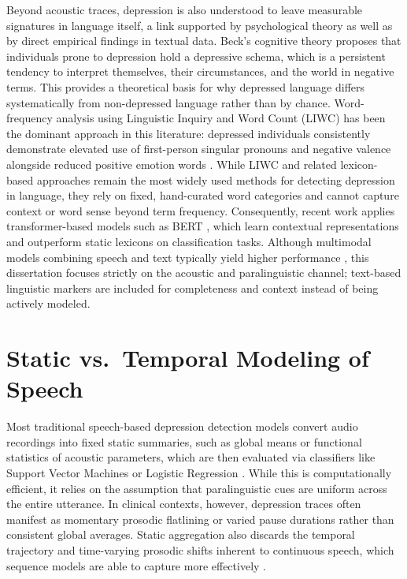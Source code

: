 \documentclass{mproj}
\begin{document}
Beyond acoustic traces, depression is also understood to leave measurable signatures in language itself, a link supported by psychological theory as well as by direct empirical findings in textual data. Beck's \cite{beck1967} cognitive theory proposes that individuals prone to depression hold a depressive schema, which is a persistent tendency to interpret themselves, their circumstances, and the world in negative terms. This provides a theoretical basis for why depressed language differs systematically from non-depressed language rather than by chance. Word-frequency analysis using Linguistic Inquiry and Word Count (LIWC) \cite{tausczik2010} has been the dominant approach in this literature: depressed individuals consistently demonstrate elevated use of first-person singular pronouns and negative valence alongside reduced positive emotion words \cite{rude2004}. While LIWC and related lexicon-based approaches remain the most widely used methods for detecting depression in language, they rely on fixed, hand-curated word categories and cannot capture context or word sense beyond term frequency. Consequently, recent work applies transformer-based models such as BERT \cite{senn2022}, which learn contextual representations and outperform static lexicons on classification tasks. Although multimodal models combining speech and text typically yield higher performance \cite{alhanai2018}, this dissertation focuses strictly on the acoustic and paralinguistic channel; text-based linguistic markers are included for completeness and context instead of being actively modeled.

\section{Static vs.\ Temporal Modeling of Speech}\label{sec:static-temporal}

Most traditional speech-based depression detection models convert audio recordings into fixed static summaries, such as global means or functional statistics of acoustic parameters, which are then evaluated via classifiers like Support Vector Machines or Logistic Regression \cite{cummins2014ivectors,moore2008}. While this is computationally efficient, it relies on the assumption that paralinguistic cues are uniform across the entire utterance. In clinical contexts, however, depression traces often manifest as momentary prosodic flatlining or varied pause durations rather than consistent global averages. Static aggregation also discards the temporal trajectory and time-varying prosodic shifts inherent to continuous speech, which sequence models are able to capture more effectively \cite{graves2013}.
\end{document}
